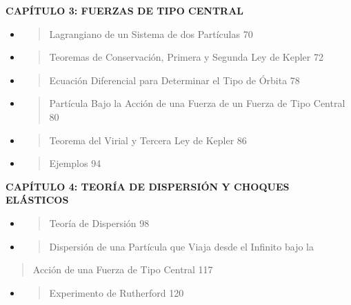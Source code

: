 \documentclass[]{article}
\begin{document}
\textbf{CAPÍTULO 3: FUERZAS DE TIPO CENTRAL}

\begin{itemize}
\item
  \begin{quote}
  Lagrangiano de un Sistema de dos Partículas 70
  \end{quote}
\item
  \begin{quote}
  Teoremas de Conservación, Primera y Segunda Ley de Kepler 72
  \end{quote}
\item
  \begin{quote}
  Ecuación Diferencial para Determinar el Tipo de Órbita 78
  \end{quote}
\item
  \begin{quote}
  Partícula Bajo la Acción de una Fuerza de un Fuerza de Tipo Central 80
  \end{quote}
\item
  \begin{quote}
  Teorema del Virial y Tercera Ley de Kepler 86
  \end{quote}
\item
  \begin{quote}
  Ejemplos 94
  \end{quote}
\end{itemize}

\textbf{CAPÍTULO 4: TEORÍA DE DISPERSIÓN Y CHOQUES ELÁSTICOS}

\begin{itemize}
\item
  \begin{quote}
  Teoría de Dispersión 98
  \end{quote}
\item
  \begin{quote}
  Dispersión de una Partícula que Viaja desde el Infinito bajo la
  \end{quote}
\end{itemize}

\begin{quote}
Acción de una Fuerza de Tipo Central 117
\end{quote}

\begin{itemize}
\item
  \begin{quote}
  Experimento de Rutherford 120
  \end{quote}
\end{itemize}
\end{document}
